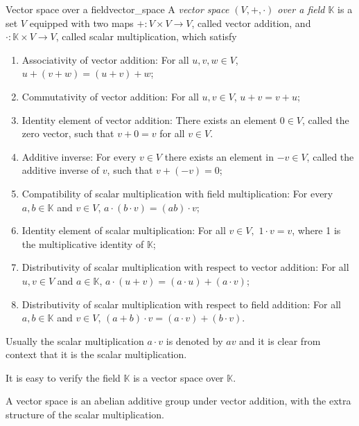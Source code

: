 \begin{definition}{Vector space over a field}{vector_space}
    A \emph{vector space \((V, +, \cdot)\) over a field \(\mathbb{K}\)} is a set \(V\) equipped with two maps \(+: V \times V \to V\), called vector addition, and \(\cdot : \mathbb{K} \times V \to V\), called scalar multiplication, which satisfy
    \begin{enumerate}[label=(\alph*)]
        \item Associativity of vector addition: For all \(u,v,w \in V\), \(u + (v + w) = (u + v) + w\);
        \item Commutativity of vector addition: For all \(u,v \in V\), \(u + v = v + u\);
        \item Identity element of vector addition: There exists an element \(0 \in V\), called the zero vector, such that \(v + 0 = v\) for all \(v \in V\).
        \item Additive inverse: For every \(v \in V\) there exists an element in \(-v \in V\), called the additive inverse of \(v\), such that \(v + (-v) = 0\);
        \item Compatibility of scalar multiplication with field multiplication: For every \(a,b\in \mathbb{K}\) and \(v \in V\), \(a\cdot(b\cdot v) = (ab) \cdot v\);
        \item Identity element of scalar multiplication: For all \(v \in V,\) \(1\cdot v = v\), where 1 is the multiplicative identity of \(\mathbb{K}\);
        \item Distributivity of scalar multiplication with respect to vector addition: For all \(u, v \in V\) and  \(a\in \mathbb{K}\), \(a\cdot (u+v) = (a\cdot u) + (a\cdot v)\);
        \item Distributivity of scalar multiplication with respect to field addition: For all \(a,b \in \mathbb{K}\) and  \(v\in V\), \((a+b)\cdot v = (a\cdot v) + (b\cdot v)\).
    \end{enumerate}
    Usually the scalar multiplication \(a \cdot v\) is denoted by \(av\) and it is clear from context that it is the scalar multiplication.
\end{definition}
\begin{remark}
    It is easy to verify the field \(\mathbb{K}\) is a vector space over \(\mathbb{K}\).
\end{remark}
\begin{remark}
    A vector space is an abelian additive group under vector addition, with the extra structure of the scalar multiplication.
\end{remark}

